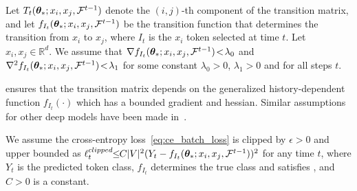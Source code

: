 \begin{assumption}
\label{assm:transition-matrix}
    Let $T_t(\bm{\theta}_* ; x_i, x_j, \mathcal{F}^{t-1})$ denote the $(i,j)$-th component of the transition matrix, and let  $f_{I_t}(\bm{\theta}_* ; x_i, x_j,  \mathcal{F}^{t-1})$ be the transition function that determines the transition from $x_i$ to $x_j$, where $I_t$ is the $x_i$ token selected at time $t$. Let $x_i, x_j \!\in\! \mathbb{R}^d$.
    We assume that $\nabla f_{I_t}(\bm{\theta}_* ; x_i, x_j, \mathcal{F}^{t-1})\!< \!\lambda_0$ and $\nabla^2 f_{I_t}(\bm{\theta}_* ; x_i, x_j,  \mathcal{F}^{t-1}) \!<\! \lambda_1$ for some constant $\lambda_0 \!>\! 0$, $\lambda_1 > 0$ and for all steps $t$.
\end{assumption}
 ensures that the transition matrix depends on the generalized history-dependent function $f_{I_t}(\cdot)$ which has a bounded gradient and hessian. Similar assumptions for other deep models have been made in~\cite{singh2023hessian, zhang2024transformers}.
%
%


\begin{assumption}
\label{assm:bound-ce}
    We assume the cross-entropy loss~\eqref{eq:ce_batch_loss} is clipped by $\epsilon > 0$ and upper bounded as  
 $\ell^{clipped}_{t} \!\!\leq\!\! C|V|^2(Y_t - f_{I_t}(\bm{\theta}_*; x_i, x_j, \mathcal{F}^{t-1}))^2$ for any time $t$, where $Y_t$ is the predicted token class, $f_{I_t}$ determines the true class and satisfies , and $C \!>\! 0$ is a constant.
\end{assumption}


